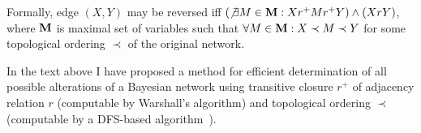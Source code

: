 \documentclass[english,cover]{fitthesis} %
\newcommand{\vars}[1]{{\bold{#1}}}         %
\begin{document}
Formally, edge $(X,Y)$ may be reversed iff $(\not \exists M \in \vars{M}: Xr^+Mr^+Y) \land (X r Y)$, where $\vars{M}$ is maximal set of variables such that $\forall M \in \vars{M}: X \prec M \prec Y$ for some topological ordering $\prec$ of the original network.

\bigskip
In the text above I have proposed a method for efficient determination of all possible alterations of a Bayesian network using transitive closure $r^+$ of adjacency relation $r$ (computable by Warshall's algorithm) and topological ordering $\prec$ (computable by a DFS-based algorithm~\cite{cormen_introduction_to_algorithms}).

\end{document}
